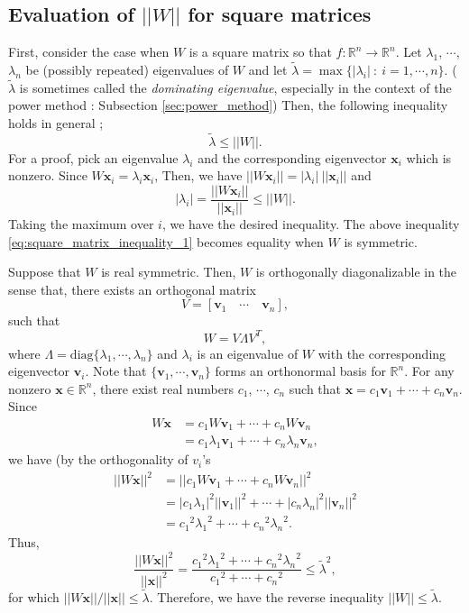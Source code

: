 \documentclass[12pt]{report}
\numberwithin{figure}{chapter}
\theoremstyle{plain}
\theoremstyle{definition}
\theoremstyle{corollary}
\theoremstyle{definition}
\theoremstyle{plain}
\theoremstyle{definition}
\theoremstyle{plain}
\newcommand\bx{\ensuremath{\boldsymbol x}}
\newcommand\bv{\ensuremath{\boldsymbol v}}
\begin{document}
%
\subsection{Evaluation of \(||W||\) for square matrices}

First, consider the case when \(W\) is a square matrix so that \(f:\mathbb R^n\to\mathbb R^n\).
Let \(\lambda_1\), \(\cdots\), \(\lambda_n\) be (possibly repeated) eigenvalues of \(W\) and let \(\tilde\lambda=\max\{|\lambda_i|\::\:i=1,\cdots,n\}\).
(\(\tilde\lambda\) is sometimes called the \emph{dominating eigenvalue}, especially in the context of the power method : Subsection \ref{sec:power_method})
Then, the following inequality holds in general ;
\begin{equation}\label{eq:square_matrix_inequality_1}
\tilde\lambda\le||W||.
\end{equation}
For a proof, pick an eigenvalue \(\lambda_i\) and the corresponding eigenvector \(\bx_i\) which is nonzero.
Since \(W\bx_i=\lambda_i\bx_i\),
Then, we have \(||W\bx_i||=|\lambda_i|\:||\bx_i||\) and
\[|\lambda_i|=\frac{||W\bx_i||}{||\bx_i||}\le||W||.\]
Taking the maximum over \(i\), we have the desired inequality.
The above inequality \eqref{eq:square_matrix_inequality_1} becomes equality when \(W\) is symmetric.

Suppose that \(W\) is real symmetric.
Then, \(W\) is orthogonally diagonalizable in the sense that, there exists an orthogonal matrix
\[V=[\bv_1\quad \cdots \quad \bv_n],\]
such that
\[W=V\Lambda V^T,\]
where \(\Lambda=\text{diag}\{\lambda_1,\cdots,\lambda_n\}\) and \(\lambda_i\) is an eigenvalue of \(W\) with the corresponding eigenvector \(\bv_i\).
Note that \(\{\bv_1,\cdots,\bv_n\}\) forms an orthonormal basis for \(\mathbb R^n\).
For any nonzero \(\bx\in\mathbb R^n\), there exist real numbers \(c_1\), \(\cdots\), \(c_n\) such that \(\bx=c_1\bv_1+\cdots+c_n\bv_n\).
Since
\begin{align*}
W\bx
&=c_1W\bv_1+\cdots+c_nW\bv_n\\
&=c_1\lambda_1\bv_1+\cdots+c_n\lambda_n\bv_n,
\end{align*}
we have (by the orthogonality of \(v_i\)'s
\begin{align*}
||W\bx||^2
&=||c_1W\bv_1+\cdots+c_nW\bv_n||^2\\
&=|c_1\lambda_1|^2||\bv_1||^2+\cdots+|c_n\lambda_n|^2||\bv_n||^2\\
&={c_1}^2{\lambda_1}^2+\cdots+{c_n}^2{\lambda_n}^2.
\end{align*}
Thus,
\[\frac{||W\bx||^2}{||\bx||^2}=\frac{{c_1}^2{\lambda_1}^2+\cdots+{c_n}^2{\lambda_n}^2}{{c_1}^2+\cdots+{c_n}^2}
\le{\tilde\lambda}^2,\]
for which \(||W\bx||/||\bx||\le\tilde\lambda\).
Therefore, we have the reverse inequality \(||W||\le\tilde\lambda\).
\end{document}
